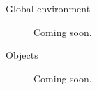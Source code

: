 \documentclass[
  a4paper,
  DIV=11,
  numbers=noendperiod,
  oneside,
  open=any]{scrreprt}
\begin{document}
\begin{description}
\item[\label{glossary-global-environment}{Global
environment}]
Coming soon.
\item[\label{glossary-objects}{Objects}]
Coming soon.
\end{description}
\end{document}
